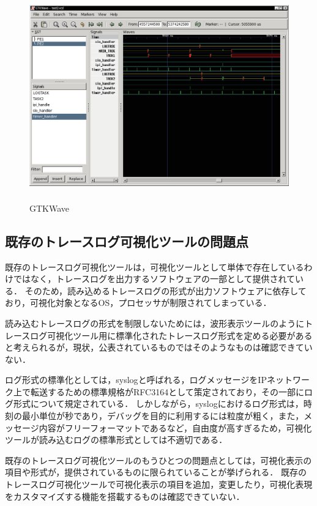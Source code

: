 \begin{figure}[p]
\begin{center}
\includegraphics[height=9cm]{img/GTKWave.eps}
\caption{GTKWave}
\label{fig:GTKWave}
\end{center}
\end{figure}

\subsection{既存のトレースログ可視化ツールの問題点}

既存のトレースログ可視化ツールは，可視化ツールとして単体で存在しているわけではなく，トレースログを出力するソフトウェアの一部として提供されている．
そのため，読み込めるトレースログの形式が出力ソフトウェアに依存しており，可視化対象となるOS，プロセッサが制限されてしまっている．

読み込むトレースログの形式を制限しないためには，波形表示ツールのようにトレースログ可視化ツール用に標準化されたトレースログ形式を定める必要があると考えられるが，現状，公表されているものではそのようなものは確認できていない．

ログ形式の標準化としては，syslog\cite{RFC3164}と呼ばれる，ログメッセージをIPネットワーク上で転送するための標準規格がRFC3164として策定されており，その一部にログ形式について規定されている．
しかしながら，syslogにおけるログ形式は，時刻の最小単位が秒であり，デバッグを目的に利用するには粒度が粗く，また，メッセージ内容がフリーフォーマットであるなど，自由度が高すぎるため，可視化ツールが読み込むログの標準形式としては不適切である．

既存のトレースログ可視化ツールのもうひとつの問題点としては，可視化表示の項目や形式が，提供されているものに限られていることが挙げられる．
既存のトレースログ可視化ツールで可視化表示の項目を追加，変更したり，可視化表現をカスタマイズする機能を搭載するものは確認できていない．

